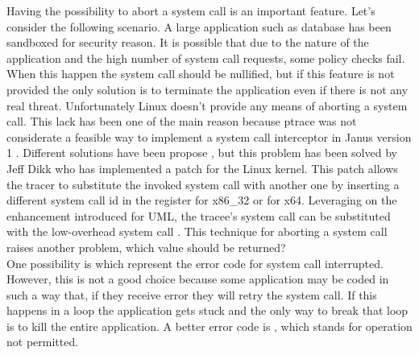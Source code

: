 Having the possibility to abort a system call is an important feature. Let’s consider the following scenario. A large application such as database has been sandboxed for security reason. It is possible that due to the nature of the application and the high number of system call requests, some policy checks fail. When this happen the system call should be nullified, but if this feature is not provided the only solution is to terminate the application even if there is not any real threat.
Unfortunately Linux doesn't provide any means of aborting a system call.  This lack has been one of the main reason because ptrace was not considerate a feasible way to implement a system call interceptor in Janus version 1 \cite{Janus}. 
Different solutions have been propose \cite{Jain99user-levelinfrastructure, goanna}, but this problem has been solved by Jeff Dikk who has implemented a patch for the Linux kernel. This patch allows the tracer to substitute the invoked system call with another one by inserting a different system call id in the  register for x86\_32 or  for x64. Leveraging on the enhancement introduced for UML, the tracee’s system call can be substituted with the low-overhead system call .
This technique for aborting a system call raises another problem, which value should be returned? \\
One possibility is  which represent the error code for system call interrupted. However, this is not a good choice because some application may be coded in such a way that, if they receive  error they will retry the system call. If this happens in a loop the application gets stuck and the only way to break that loop is to kill the entire application. A better error code is , which stands for operation not permitted.